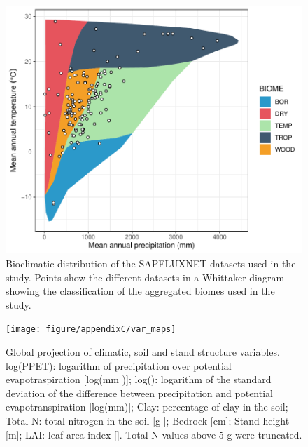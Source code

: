 \documentclass[11pt,twoside]{reedthesis}
\begin{document}
\newpage

\setlength{\abovecaptionskip}{15pt}
\begin{figure}[H]

{\centering \includegraphics[width=1\linewidth]{figure/appendixC/gg_biomes} 

}

\caption[Bioclimatic distribution of the SAPFLUXNET datasets used in the study.]{Bioclimatic distribution of the SAPFLUXNET datasets used in the study. Points show the different datasets in a Whittaker diagram showing the classification of the aggregated biomes used in the study.}\label{fig:unnamed-chunk-9}
\end{figure}
\setlength{\abovecaptionskip}{0pt}

\newpage

\setlength{\abovecaptionskip}{15pt}
\begin{figure}[H]

{\centering \texttt{[image: figure/appendixC/var\_maps]} 

}

\caption[Global projection of climatic, soil and stand structure variables.]{Global projection of climatic, soil and stand structure variables. log(PPET): logarithm of precipitation over potential evapotraspiration [log(mm )]; log(): logarithm of the standard deviation of the difference between precipitation and potential evapotranspiration [log(mm)]; Clay: percentage of clay in the soil; Total N: total nitrogen in the soil [g ];  Bedrock [cm]; Stand height [m]; LAI: leaf area index []. Total N values above 5 g  were truncated.}\label{fig:unnamed-chunk-10}
\end{figure}
\setlength{\abovecaptionskip}{0pt}
\end{document}
